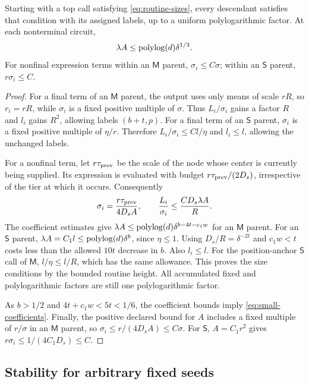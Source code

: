 \begin{lemma}
\label{lem:compiler-sizes}
Starting with a top call satisfying
\eqref{eq:routine-sizes}, every descendant satisfies that condition
with its assigned labels, up to a uniform polylogarithmic factor.
At each nonterminal circuit,
\begin{equation}
 \lambda A\le\operatorname{polylog}(d)\delta^{1/3}.
 \label{eq:small-coefficients}
\end{equation}
For nonfinal expression terms within an $\mathsf M$ parent,
$\sigma_i\le C\sigma$; within an $\mathsf S$ parent,
$r\sigma_i\le C$.
\end{lemma}
\begin{proof}
For a final term of an $\mathsf M$ parent, the output uses only means of scale $rR$, so $r_i=rR$, while $\sigma_i$ is a fixed positive multiple
of $\sigma$.  Thus $L_i/\sigma_i$ gains a factor $R$ and $l_i$
gains $R^2$, allowing labels $(b+t,p)$.
For a final term of an $\mathsf S$ parent,
$\sigma_i$ is a fixed positive multiple of $\eta/r$.
Therefore $L_i/\sigma_i\le Cl/\eta$ and $l_i\le l$, allowing
the unchanged labels.

For a nonfinal term, let $r\tau_{\rm prev}$ be the scale of the
node whose center is currently being supplied.  Its expression is
evaluated with budget $r\tau_{\rm prev}/(2D_s)$, irrespective of
the tier at which it occurs.  Consequently
\[
 \sigma_i=\frac{r\tau_{\rm prev}}{4D_sA},
 \qquad
 \frac{L_i}{\sigma_i}
 \le \frac{CD_s\lambda A}{R}.
\]
The coefficient estimates give
$\lambda A\le\operatorname{polylog}(d)\delta^{b-4t-c_1w}$ for an
$\mathsf M$ parent.  For an $\mathsf S$ parent,
$\lambda A=C_1l\le\operatorname{polylog}(d)\delta^b$, since $\eta\le1$.
Using $D_s/R=\delta^{-2t}$ and $c_1w<t$ costs less than the
allowed $10t$ decrease in $b$.  Also $l_i\le l$.
For the position-anchor $\mathsf S$ call of $\mathsf M$,
$l/\eta\le l/R$, which has the same allowance.
This proves the size conditions by the bounded routine height.
All accumulated fixed and polylogarithmic factors are still one
polylogarithmic factor.

As $b>1/2$ and $4t+c_1w<5t<1/6$, the coefficient bounds imply
\eqref{eq:small-coefficients}.  Finally, the positive declared bound
for $A$ includes a fixed multiple of $r/\sigma$ in an
$\mathsf M$ parent, so
$\sigma_i\le r/(4D_sA)\le C\sigma$.
For $\mathsf S$, $A=C_1r^2$ gives
$r\sigma_i\le1/(4C_1D_s)\le C$.
\end{proof}

\subsection{Stability for arbitrary fixed seeds}

